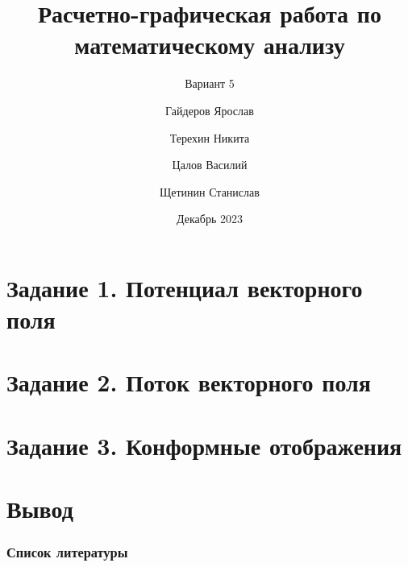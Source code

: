 \documentclass[
  aspectratio=169,
  xcolor={svgnames},
  hyperref={colorlinks,citecolor=DarkBlue,urlcolor=DarkBlue,linkcolor=DarkBlue},
  hideallsubsections
]{beamer}
\title[РГР по матанализу]
{Расчетно-графическая работа по математическому анализу}
\subtitle{Вариант 5}
\author[Гайдеров, Терехин, Цалов, Щетинин]
{Гайдеров Ярослав \and Терехин Никита \and Цалов Василий \\ \and Щетинин Станислав}
\institute[ИТМО]{Университет ИТМО}
\date[2023 г.]{Декабрь 2023}
\begin{document}
\frame{\titlepage}

\section{Задание 1. Потенциал векторного поля}


\section{Задание 2. Поток векторного поля}


\section{Задание 3. Конформные отображения}


\section{Вывод}


\begin{frame}\frametitle{Список литературы}
	\nocite{*}
	\printbibliography
\end{frame}
\end{document}
